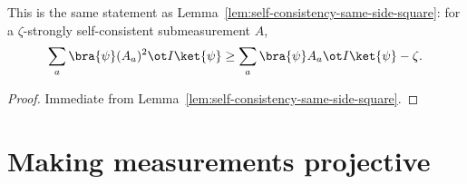 \begin{theorem}\label{prop:cool-prop}
	\leanok
	This is the same statement as Lemma~\ref{lem:self-consistency-same-side-square}: for a $\zeta$-strongly self-consistent submeasurement $A$,
	\[
		\sum_a \bra{\psi} (A_a)^2 \ot I \ket{\psi} \geq \sum_a \bra{\psi} A_a \ot I \ket{\psi} -\zeta.
	\]
\end{theorem}
\begin{proof}
	\leanok
	Immediate from Lemma~\ref{lem:self-consistency-same-side-square}.
\end{proof}


\chapter{Making measurements projective}
\label{chap:projective}

